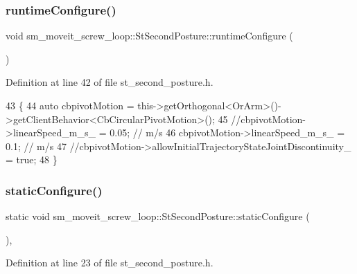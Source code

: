 \subsubsection{\texorpdfstring{runtime\+Configure()}{runtimeConfigure()}}
{\footnotesize\ttfamily void sm\+\_\+moveit\+\_\+screw\+\_\+loop\+::\+St\+Second\+Posture\+::runtime\+Configure (\begin{DoxyParamCaption}{ }\end{DoxyParamCaption})\hspace{0.3cm}{\ttfamily [inline]}}



Definition at line 42 of file st\+\_\+second\+\_\+posture.\+h.


\begin{DoxyCode}
43         \{
44             \textcolor{keyword}{auto} cbpivotMotion = this->getOrthogonal<OrArm>()->getClientBehavior<CbCircularPivotMotion>();
45             \textcolor{comment}{//cbpivotMotion->linearSpeed\_m\_s\_ = 0.05; // m/s}
46             cbpivotMotion->linearSpeed\_m\_s\_ = 0.1; \textcolor{comment}{// m/s}
47             \textcolor{comment}{//cbpivotMotion->allowInitialTrajectoryStateJointDiscontinuity\_ = true;}
48         \}
\end{DoxyCode}
\mbox{\label{structsm__moveit__screw__loop_1_1StSecondPosture_a704c12b1f6ee40039fa1c6f1e3ec0ba4}} 
\subsubsection{\texorpdfstring{static\+Configure()}{staticConfigure()}}
{\footnotesize\ttfamily static void sm\+\_\+moveit\+\_\+screw\+\_\+loop\+::\+St\+Second\+Posture\+::static\+Configure (\begin{DoxyParamCaption}{ }\end{DoxyParamCaption})\hspace{0.3cm}{\ttfamily [inline]}, {\ttfamily [static]}}



Definition at line 23 of file st\+\_\+second\+\_\+posture.\+h.


